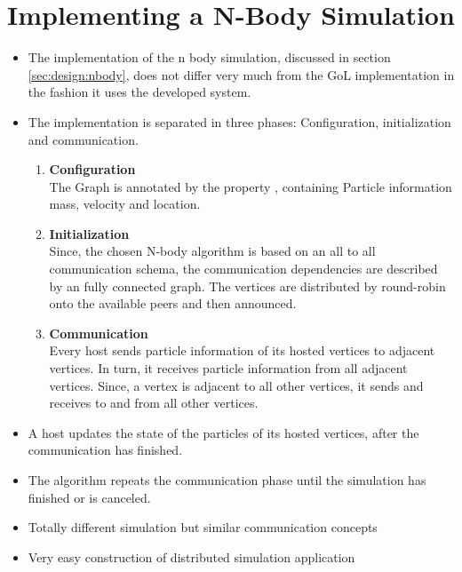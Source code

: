 \section{Implementing a N-Body Simulation}
\begin{itemize}
\item The implementation of the n body simulation, discussed in
  section \ref{sec:design:nbody}, does not differ very much from the
  GoL implementation in the fashion it uses the developed system.

\item The implementation is separated in three phases: Configuration, initialization
  and communication.

  \begin{enumerate}
  \item \textbf{Configuration}\\
    The Graph is annotated by the property , containing
    Particle information mass, velocity and location.

  \item \textbf{Initialization}\\
    Since, the chosen N-body algorithm is based on an all to all communication
    schema, the communication dependencies are described by an fully connected
    graph. The vertices are distributed by round-robin onto the available
    peers and then announced.

  \item \textbf{Communication}\\
    Every host sends particle information of its hosted vertices to
    adjacent vertices. In turn, it receives particle information from
    all adjacent vertices. Since, a vertex is adjacent to all other
    vertices, it sends and receives to and from all other vertices.
  \end{enumerate}

\item A host updates the state of the particles of its hosted
  vertices, after the communication has finished.

\item The algorithm repeats the communication phase
  until the simulation has finished or is canceled.

\item Totally different simulation but similar communication
  concepts

\item Very easy construction of distributed simulation application
  
\end{itemize}

